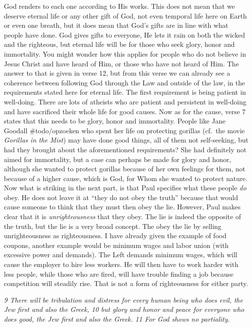 God renders to each one according to His works. This does not mean that
we deserve eternal life or any other gift of God, not even temporal life
here on Earth or even one breath, but it does mean that God's gifts are
in line with what people have done. God gives gifts to everyone, He lets
it rain on both the wicked and the righteous, but eternal life will be
for those who seek glory, honor and immortality. You might wonder how
this applies for people who do not believe in Jesus Christ and have
heard of Him, or those who have not heard of Him. The answer to that is
given in verse 12, but from this verse we can already see a coherence
between following God through the Law and outside of the law, in the
requirements stated here for eternal life. The first requirement is
being patient in well-doing. There are lots of atheists who are patient
and persistent in well-doing and have sacrificed their whole life for
good causes. Now as for the cause, verse 7 states that this needs to be
glory, honor and immortality. People like Jane Goodall \#todo/opzoeken
who spent her life on protecting gorillas (cf.~the movie \emph{Gorillas
in the Mist}) may have done good things, all of them not self-seeking,
but had they brought about the aforementioned requirements? She had
definitely not aimed for immortality, but a case can perhaps be made for
glory and honor, although she wanted to protect gorillas because of her
own feelings for them, not because of a higher cause, which is God, for
Whom she wanted to protect nature. Now what is striking in the next
part, is that Paul specifies what these people \emph{do} obey. He does
not leave it at ``they do not obey the truth'' because that would cause
someone to think that they must then obey the lie. However, Paul makes
clear that it is \emph{unrighteousness} that they obey. The lie is
indeed the opposite of the truth, but the lie is a very broad concept.
The obey the lie by selling unrighteousness as righteousness. I have
already given the example of food coupons, another example would be
minimum wages and labor union (with excessive power and demands). The
Left demands minimum wages, which will cause the employer to hire less
workers. He will then have to work harder with less people, while those
who are fired, will have trouble finding a job because competition will
steadily rise. That is not a form of righteousness for either party.

\emph{9 There will be tribulation and distress for every human being who
does evil, the Jew first and also the Greek, 10 but glory and honor and
peace for everyone who does good, the Jew first and also the Greek. 11
For God shows no partiality.}

